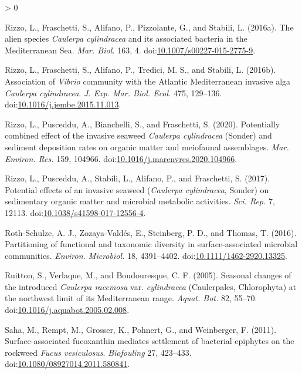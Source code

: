 \documentclass[
  12pt,
]{article}
\newlength{\cslhangindent}
\newenvironment{CSLReferences}[2] %
 {%
  \setlength{\parindent}{0pt}
  \ifodd #1 \everypar{\setlength{\hangindent}{\cslhangindent}}\ignorespaces\fi
  \ifnum #2 > 0
  \setlength{\parskip}{#2\baselineskip}
  \fi
 }%
 {}
\begin{document}
\begin{CSLReferences}{1}{0}
\leavevmode\hypertarget{ref-Rizzo2016}{}%
Rizzo, L., Fraschetti, S., Alifano, P., Pizzolante, G., and Stabili, L.
(2016a). The alien species {\emph{Caulerpa cylindracea}} and its
associated bacteria in the {Mediterranean Sea}. \emph{Mar. Biol.} 163,
4.
doi:\href{https://doi.org/10.1007/s00227-015-2775-9}{10.1007/s00227-015-2775-9}.

\leavevmode\hypertarget{ref-Rizzo2016a}{}%
Rizzo, L., Fraschetti, S., Alifano, P., Tredici, M. S., and Stabili, L.
(2016b). Association of {\emph{Vibrio}} community with the {Atlantic
Mediterranean} invasive alga {\emph{Caulerpa cylindracea{\emph{}}}}.
\emph{J. Exp. Mar. Biol. Ecol.} 475, 129--136.
doi:\href{https://doi.org/10.1016/j.jembe.2015.11.013}{10.1016/j.jembe.2015.11.013}.

\leavevmode\hypertarget{ref-Rizzo2020}{}%
Rizzo, L., Pusceddu, A., Bianchelli, S., and Fraschetti, S. (2020).
Potentially combined effect of the invasive seaweed {\emph{Caulerpa
cylindracea}} ({Sonder}) and sediment deposition rates on organic matter
and meiofaunal assemblages. \emph{Mar. Environ. Res.} 159, 104966.
doi:\href{https://doi.org/10.1016/j.marenvres.2020.104966}{10.1016/j.marenvres.2020.104966}.

\leavevmode\hypertarget{ref-Rizzo2017}{}%
Rizzo, L., Pusceddu, A., Stabili, L., Alifano, P., and Fraschetti, S.
(2017). Potential effects of an invasive seaweed ({\emph{Caulerpa
cylindracea}}, {Sonder}) on sedimentary organic matter and microbial
metabolic activities. \emph{Sci. Rep.} 7, 12113.
doi:\href{https://doi.org/10.1038/s41598-017-12556-4}{10.1038/s41598-017-12556-4}.

\leavevmode\hypertarget{ref-Roth-Schulze2016}{}%
Roth-Schulze, A. J., Zozaya-Valdés, E., Steinberg, P. D., and Thomas, T.
(2016). Partitioning of functional and taxonomic diversity in
surface-associated microbial communities. \emph{Environ. Microbiol.} 18,
4391--4402.
doi:\href{https://doi.org/10.1111/1462-2920.13325}{10.1111/1462-2920.13325}.

\leavevmode\hypertarget{ref-Ruitton2005}{}%
Ruitton, S., Verlaque, M., and Boudouresque, C. F. (2005). Seasonal
changes of the introduced {\emph{Caulerpa racemosa}} var.
{\emph{cylindracea}} ({Caulerpales}, {Chlorophyta}) at the northwest
limit of its {Mediterranean} range. \emph{Aquat. Bot.} 82, 55--70.
doi:\href{https://doi.org/10.1016/j.aquabot.2005.02.008}{10.1016/j.aquabot.2005.02.008}.

\leavevmode\hypertarget{ref-Saha2011}{}%
Saha, M., Rempt, M., Grosser, K., Pohnert, G., and Weinberger, F.
(2011). Surface-associated fucoxanthin mediates settlement of bacterial
epiphytes on the rockweed {\emph{Fucus vesiculosus}}. \emph{Biofouling}
27, 423--433.
doi:\href{https://doi.org/10.1080/08927014.2011.580841}{10.1080/08927014.2011.580841}.


\end{CSLReferences}
\end{document}
